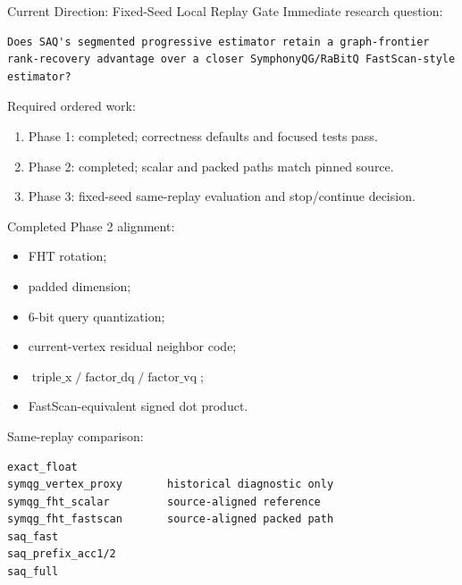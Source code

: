 \documentclass[aspectratio=169,10pt]{beamer}
\begin{document}
\begin{frame}[fragile]{Current Direction: Fixed-Seed Local Replay Gate}
\scriptsize
Immediate research question:
\begin{lstlisting}
Does SAQ's segmented progressive estimator retain a graph-frontier
rank-recovery advantage over a closer SymphonyQG/RaBitQ FastScan-style
estimator?
\end{lstlisting}

Required ordered work:
\begin{enumerate}
  \item Phase 1: completed; correctness defaults and focused tests pass.
  \item Phase 2: completed; scalar and packed paths match pinned source.
  \item Phase 3: fixed-seed same-replay evaluation and stop/continue decision.
\end{enumerate}

Completed Phase 2 alignment:
\begin{itemize}
  \item FHT rotation;
  \item padded dimension;
  \item 6-bit query quantization;
  \item current-vertex residual neighbor code;
  \item \(\operatorname{triple\_x}/\operatorname{factor\_dq}/\operatorname{factor\_vq}\);
  \item FastScan-equivalent signed dot product.
\end{itemize}

Same-replay comparison:
\begin{lstlisting}
exact_float
symqg_vertex_proxy       historical diagnostic only
symqg_fht_scalar         source-aligned reference
symqg_fht_fastscan       source-aligned packed path
saq_fast
saq_prefix_acc1/2
saq_full
\end{lstlisting}
\end{frame}
\end{document}

